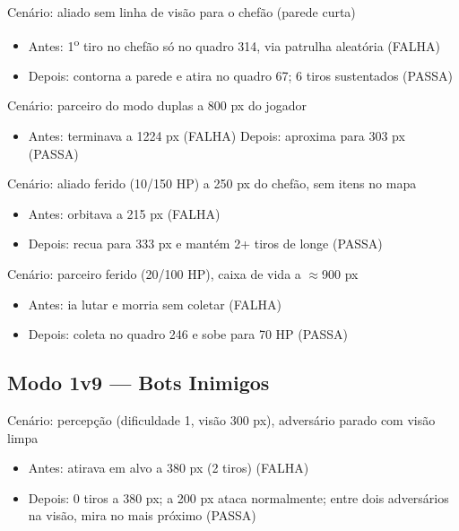 \documentclass[a4paper,12pt]{article}
\begin{document}
\vspace{0.3cm}
Cenário: aliado sem linha de visão para o chefão (parede curta)
\begin{itemize}
  \item Antes: 1\textsuperscript{o} tiro no chefão só no quadro 314, via patrulha aleatória
        (FALHA)
  \item Depois: contorna a parede e atira no quadro 67; 6 tiros sustentados (PASSA)
\end{itemize}

\vspace{0.3cm}
Cenário: parceiro do modo duplas a 800 px do jogador
\begin{itemize}
  \item Antes: terminava a 1224 px (FALHA) \quad Depois: aproxima para 303 px (PASSA)
\end{itemize}

\vspace{0.3cm}
Cenário: aliado ferido (10/150 HP) a 250 px do chefão, sem itens no mapa
\begin{itemize}
  \item Antes: orbitava a 215 px (FALHA)
  \item Depois: recua para 333 px e mantém 2+ tiros de longe (PASSA)
\end{itemize}

\vspace{0.3cm}
Cenário: parceiro ferido (20/100 HP), caixa de vida a $\approx$900 px
\begin{itemize}
  \item Antes: ia lutar e morria sem coletar (FALHA)
  \item Depois: coleta no quadro 246 e sobe para 70 HP (PASSA)
\end{itemize}

\subsection*{Modo 1v9 --- Bots Inimigos}

Cenário: percepção (dificuldade 1, visão 300 px), adversário parado com visão limpa
\begin{itemize}
  \item Antes: atirava em alvo a 380 px (2 tiros) (FALHA)
  \item Depois: 0 tiros a 380 px; a 200 px ataca normalmente; entre dois adversários na
        visão, mira no mais próximo (PASSA)
\end{itemize}
\end{document}
